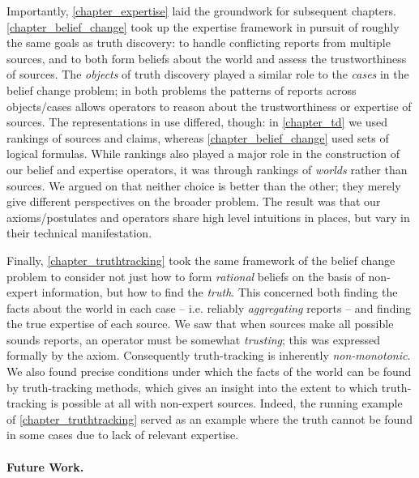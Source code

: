 Importantly, \cref{chapter_expertise} laid the groundwork for subsequent
chapters. \cref{chapter_belief_change} took up the expertise framework in
pursuit of roughly the same goals as truth discovery: to handle conflicting
reports from multiple sources, and to both form beliefs about the world and
assess the trustworthiness of sources. The \emph{objects} of truth discovery
played a similar role to the \emph{cases} in the belief change problem; in both
problems the patterns of reports across objects/cases allows operators to
reason about the trustworthiness or expertise of sources. The representations
in use differed, though: in \cref{chapter_td} we used rankings of sources and
claims, whereas \cref{chapter_belief_change} used sets of logical formulas.
While rankings also played a major role in the construction of our belief and
expertise operators, it was through rankings of \emph{worlds} rather than
sources. We argued on  that neither choice is
better than the other; they merely give different perspectives on the broader
problem. The result was that our axioms/postulates and operators share high
level intuitions in places, but vary in their technical manifestation.

{
    

Finally, \cref{chapter_truthtracking} took the same framework of the belief
change problem to consider not just how to form \emph{rational} beliefs on the
basis of non-expert information, but how to find the \emph{truth}. This
concerned both finding the facts about the world in each case -- i.e. reliably
\emph{aggregating} reports -- and finding the true expertise of each source.
We saw that when sources make all possible sounds reports, an operator must be
somewhat \emph{trusting}; this was expressed formally by the \credulity{}
axiom. Consequently truth-tracking is inherently \emph{non-monotonic}. We also
found precise conditions under which the facts of the world can be found by
truth-tracking methods, which gives an insight into the extent to which
truth-tracking is possible at all with non-expert sources. Indeed, the running
example of \cref{chapter_truthtracking} served as an example where the truth
cannot be found in some cases due to lack of relevant expertise.

}

\paragraph{Future Work.}

